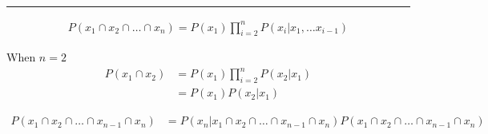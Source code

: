 \documentclass[12pt]{article}
\begin{document}
\begin{enumerate}
    \noindent\rule{\linewidth}{1pt}

    \begin{align*}
        P(x_1 \cap x_2 \cap \dots \cap x_n) = P(x_1) \prod_{i=2}^{n} P(x_i | x_1, \dots x_{i-1}) 
    \end{align*}

    When $n=2$
    \begin{align*}
        P(x_1 \cap x_2) &= P(x_1) \prod_{i=2}^{n} P(x_2 | x_1) \\
                        &= P(x_1) P(x_2 | x_1)
    \end{align*}
        
    \begin{align*}
        P(x_1 \cap x_2 \cap \dots \cap x_{n-1} \cap x_n) &= P(x_n | x_1 \cap x_2 \cap \dots \cap x_{n-1} \cap x_n) P(x_1 \cap x_2 \cap \dots \cap x_{n-1} \cap x_n)
    \end{align*}

\end{enumerate}
\end{document}
